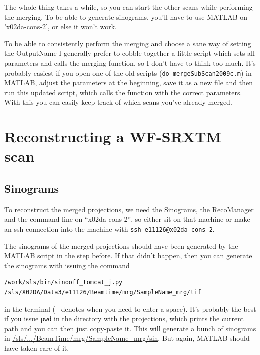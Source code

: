 \documentclass[a4paper]{scrartcl}
\begin{document}
The whole thing takes a while, so you can start the other scans while performing the merging. To be able to generate sinograms, you'll have to use MATLAB on 'x02da-cons-2', or else it won't work.

To be able to consistently perform the merging and choose a sane way of setting the OutputName I generally prefer to cobble together a little script which sets all parameters and calls the merging function, so I don't have to think too much. It's probably easiest if you open one of the old scripts (\verb+do_mergeSubScan2009c.m+) in MATLAB, adjust the parameters at the beginning, save it as a new file and then run this updated script, which calls the function with the correct parameters. With this you can easily keep track of which scans you've already merged.

\lstset{%
	breaklines=true,			%
	showspaces=true
	}%
	
\section[Reconstruction]{Reconstructing a WF-SRXTM scan}
\subsection{Sinograms}
To reconstruct the merged projections, we need the Sinograms, the RecoManager and the command-line on ``x02da-cons-2'', so either sit on that machine or make an ssh-connection into the machine with \verb+ssh e11126@x02da-cons-2+.

The sinograms of the merged projections should have been generated by the MATLAB script in the step before. If that didn't happen, then you can generate the sinograms with issuing the command
\begin{lstlisting}
/work/sls/bin/sinooff_tomcat_j.py /sls/X02DA/Data3/e11126/Beamtime/mrg/SampleName_mrg/tif
\end{lstlisting}
in the terminal (\verb*+ + denotes when you need to enter a space). It's probably the best if you issue \verb+pwd+ in the directory with the projections, which prints the current path and you can then just copy-paste it. This will generate a bunch of sinograms in \url{/sls/.../BeamTime/mrg/SampleName_mrg/sin}. But again, MATLAB should have taken care of it.
\end{document}
